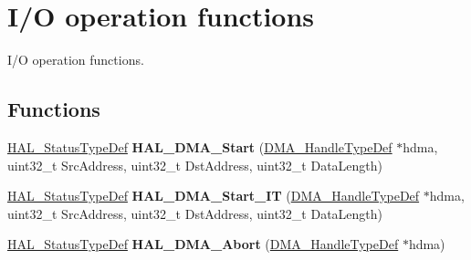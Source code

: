\hypertarget{group___d_m_a___exported___functions___group2}{}\section{I/O operation functions}
\label{group___d_m_a___exported___functions___group2}


I/O operation functions.  


\subsection*{Functions}
\begin{DoxyCompactItemize}
\item 
\mbox{\label{group___d_m_a___exported___functions___group2_ga96fbd9c285135f558fd9283a57406330}} 
\hyperlink{stm32f4xx__hal__def_8h_a63c0679d1cb8b8c684fbb0632743478f}{H\+A\+L\+\_\+\+Status\+Type\+Def} {\bfseries H\+A\+L\+\_\+\+D\+M\+A\+\_\+\+Start} (\hyperlink{group___d_m_a___exported___types_ga41b754a906b86bce54dc79938970138b}{D\+M\+A\+\_\+\+Handle\+Type\+Def} $\ast$hdma, uint32\+\_\+t Src\+Address, uint32\+\_\+t Dst\+Address, uint32\+\_\+t Data\+Length)
\item 
\mbox{\label{group___d_m_a___exported___functions___group2_ga7eddc0931ac8a3d77b23d6d5e68407c7}} 
\hyperlink{stm32f4xx__hal__def_8h_a63c0679d1cb8b8c684fbb0632743478f}{H\+A\+L\+\_\+\+Status\+Type\+Def} {\bfseries H\+A\+L\+\_\+\+D\+M\+A\+\_\+\+Start\+\_\+\+IT} (\hyperlink{group___d_m_a___exported___types_ga41b754a906b86bce54dc79938970138b}{D\+M\+A\+\_\+\+Handle\+Type\+Def} $\ast$hdma, uint32\+\_\+t Src\+Address, uint32\+\_\+t Dst\+Address, uint32\+\_\+t Data\+Length)
\item 
\mbox{\label{group___d_m_a___exported___functions___group2_ga001f9fb04328a7460f9ff16908ff987c}} 
\hyperlink{stm32f4xx__hal__def_8h_a63c0679d1cb8b8c684fbb0632743478f}{H\+A\+L\+\_\+\+Status\+Type\+Def} {\bfseries H\+A\+L\+\_\+\+D\+M\+A\+\_\+\+Abort} (\hyperlink{group___d_m_a___exported___types_ga41b754a906b86bce54dc79938970138b}{D\+M\+A\+\_\+\+Handle\+Type\+Def} $\ast$hdma)
\item 
\mbox{\label{group___d_m_a___exported___functions___group2_ga6677d7e614747341a58ffd7a048fd390}} 

\end{DoxyCompactItemize}
